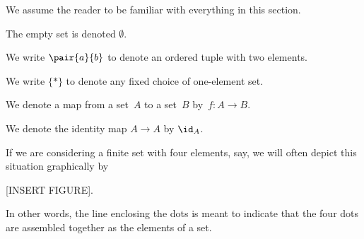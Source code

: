 \label{sec:notn_and_background}


We assume the reader to be familiar with everything in this section.

The empty set is denoted $\emptyset$.

We write $\pair{a}{b}$ to denote an ordered tuple with two elements.

We write $\{*\}$ to denote any fixed choice of one-element set.

We denote a map from a set~$A$ to a set~$B$ by~$f\colon A\to B$.

We denote the identity map $A\to A$ by $\id_A$.

If we are considering a finite set with four elements, say, we will often depict this situation graphically by

[INSERT FIGURE].

In other words, the line enclosing the dots is meant to indicate that the four dots are assembled together as the elements of a set.


